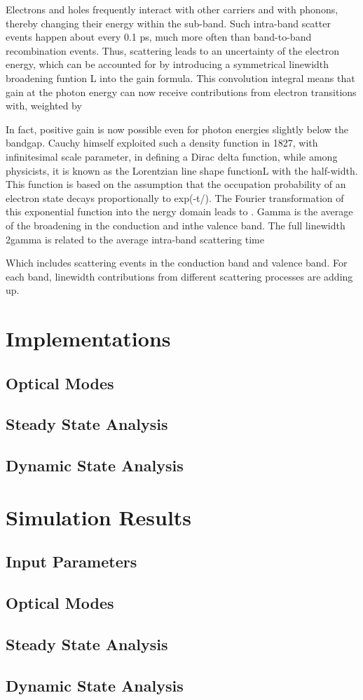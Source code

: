 Electrons and holes frequently interact with other carriers and with phonons,
thereby changing their energy within the sub-band. Such intra-band scatter
events happen about every 0.1 ps, much more often than band-to-band
recombination events. Thus, scattering leads to an uncertainty of the electron
energy, which can be accounted for by introducing a symmetrical linewidth
broadening funtion L into the gain formula.  This convolution integral means
that gain at the photon energy can now receive contributions from electron
transitions with, weighted by 

In fact, positive gain is now possible even for photon energies slightly below
the bandgap. Cauchy himself exploited such a density function in 1827, with
infinitesimal scale parameter, in defining a Dirac delta function, while among
physicists, it is known as the Lorentzian line shape functionL with the
half-width. This function is based on the assumption that the occupation
probability of an electron state decays proportionally to exp(-t/). The Fourier
transformation of this exponential function into the nergy domain leads to .
Gamma is the average of the broadening in the conduction and inthe valence
band. The full linewidth 2gamma is related to the average intra-band scattering
time 

Which includes scattering events in the conduction band and valence band. For
each band, linewidth contributions from different scattering processes are
adding up.

\section{Implementations} \label{corrections}
\subsection{Optical Modes}
\subsection{Steady State Analysis}
\subsection{Dynamic State Analysis}

\section{Simulation Results} \label{corrections}
\subsection{Input Parameters}
\subsection{Optical Modes}
\subsection{Steady State Analysis}
\subsection{Dynamic State Analysis}
